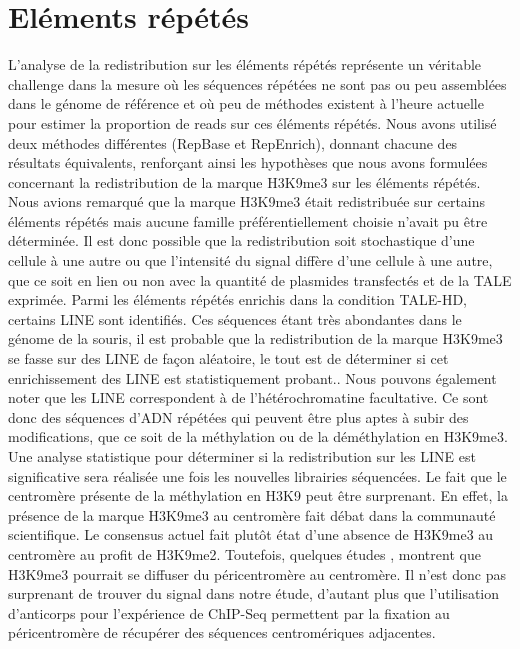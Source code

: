 \documentclass[a4paper,12pt,times]{report}
\begin{document}
  \section{Eléments répétés}
L'analyse de la redistribution sur les éléments répétés représente un véritable challenge dans la mesure où les séquences répétées ne sont pas ou peu assemblées dans le génome de référence et où peu de méthodes existent à l'heure actuelle pour estimer la proportion de reads sur ces éléments répétés. Nous avons utilisé deux méthodes différentes (RepBase et RepEnrich),  donnant chacune des résultats équivalents, renforçant ainsi les hypothèses que nous avons formulées concernant la redistribution de la marque H3K9me3 sur les éléments répétés.
\newline Nous avions remarqué que la marque H3K9me3 était redistribuée sur certains éléments répétés mais aucune famille préférentiellement choisie n'avait pu être déterminée. 
Il est donc possible que la redistribution soit stochastique d'une cellule à une autre 
ou que l'intensité du signal diffère d'une cellule à une autre, que ce soit en lien ou non avec la quantité de plasmides transfectés et de la TALE exprimée.
\newline
Parmi les éléments répétés enrichis dans la condition TALE-HD, certains LINE sont identifiés. Ces séquences étant très abondantes dans le génome de la souris, il est probable que la redistribution de la marque H3K9me3 se fasse sur des LINE de façon aléatoire, le tout est de déterminer si cet enrichissement des LINE est statistiquement probant.. Nous pouvons également noter que les LINE correspondent à de l'hétérochromatine facultative. Ce sont donc des séquences d'ADN répétées qui peuvent être plus aptes à subir des modifications, que ce soit de la méthylation ou de la déméthylation en H3K9me3. Une analyse statistique pour déterminer si la redistribution sur les LINE est significative sera réalisée une fois les nouvelles librairies séquencées. 
\newline
Le fait que le centromère présente de la méthylation en H3K9 peut être surprenant. En effet, la présence de la marque H3K9me3 au centromère fait débat dans la communauté scientifique. Le consensus actuel fait plutôt état d'une absence de H3K9me3 au centromère au profit de H3K9me2.
Toutefois, quelques études \cite{Discu1}, \cite{Discu2} montrent que H3K9me3 pourrait se diffuser du péricentromère au centromère. 
Il n'est donc pas surprenant de trouver du signal dans notre étude, d'autant plus que l'utilisation d'anticorps pour l'expérience de ChIP-Seq permettent  par la fixation au péricentromère de récupérer des séquences centromériques adjacentes.
\end{document}
